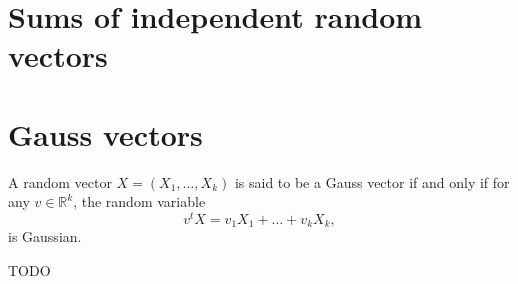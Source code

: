 \section{Sums of independent random vectors}%
\label{sec:Sums of independent random vectors}

\section{Gauss vectors}%
\label{sec:Gauss vectors}
\begin{definition}
    \label{def:11.6}
    A random vector $X=(X_1, \ldots, X_k)$ is said to be a Gauss vector if and only if for any 
    $v \in \mathbb{R}^{k}$, the random variable
    \[
    v^{t}X = v_1X_1 + \ldots + v_kX_k,
    \] 
    is Gaussian.
\end{definition}

\begin{remark}[]
    \label{rem:11.11}
    TODO
\end{remark}

